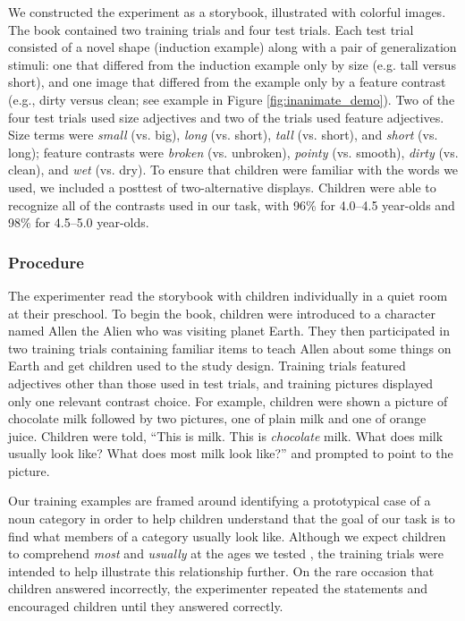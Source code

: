 \documentclass[man]{apa2}
\begin{document}
We constructed the experiment as a storybook, illustrated with colorful images. The book contained two training trials and four test trials. Each test trial consisted of a novel shape (induction example) along with a pair of generalization stimuli: one that differed from the induction example only by size (e.g. tall versus short), and one image that differed from the example only by a feature contrast (e.g., dirty versus clean; see example in Figure \ref{fig:inanimate_demo}). Two of the four test trials used size adjectives and two of the trials used feature adjectives. Size terms were \emph{small} (vs. big), \emph{long} (vs. short), \emph{tall} (vs. short), and \emph{short} (vs. long);  feature contrasts were \emph{broken} (vs. unbroken), \emph{pointy} (vs. smooth), \emph{dirty} (vs. clean), and \emph{wet} (vs. dry).  To ensure that children were familiar with the words we used, we included a posttest of two-alternative displays.  Children were able to recognize all of the contrasts used in our task, with 96\% for 4.0--4.5 year-olds and 98\% for 4.5--5.0 year-olds.  

\subsubsection{Procedure}

The experimenter read the storybook with children individually in a quiet room at their preschool. To begin the book, children were introduced to a character named Allen the Alien who was visiting planet Earth.  They then participated in two training trials containing familiar items to teach Allen about some things on Earth and get children used to the study design.  Training trials featured adjectives other than those used in test trials, and training pictures displayed only one relevant contrast choice.  For example, children were shown a picture of chocolate milk followed by two pictures, one of plain milk and one of orange juice. Children were told, ``This is milk. This is \emph{chocolate} milk.  What does milk usually look like?  What does most milk look like?'' and prompted to point to the picture. 

Our training examples are framed around identifying a prototypical case of a noun category in order to help children understand that the goal of our task is to find what members of a category usually look like. Although we expect children to comprehend \emph{most} and \emph{usually} at the ages we tested \cite{halberda2008}, the training trials were intended to  help illustrate this relationship further.
On the rare occasion that children answered incorrectly, the experimenter repeated the statements and encouraged children until they answered correctly.  
\end{document}
